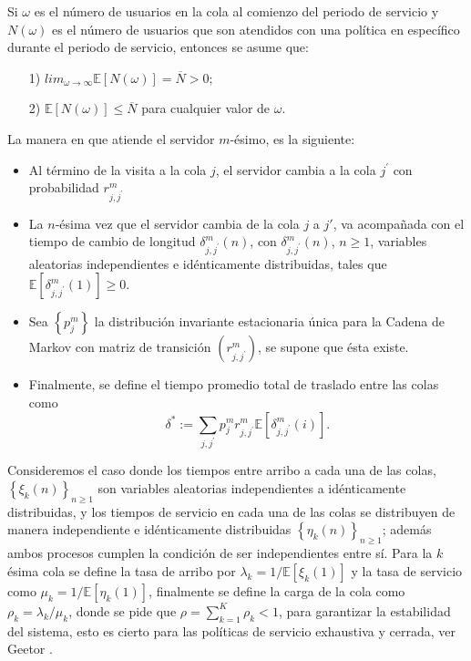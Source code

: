 \documentclass{article}
\newcommand{\esp}{\mathbb{E}}
\begin{document}
Si $\omega$ es el n\'umero de usuarios en la cola al comienzo del periodo de servicio y $N\left(\omega\right)$ es el n\'umero de usuarios que son atendidos con una pol\'itica en espec\'ifico durante el periodo de servicio, entonces se asume que:
\begin{itemize}
\item[1)]\label{S1}$lim_{\omega\rightarrow\infty}\esp\left[N\left(\omega\right)\right]=\overline{N}>0$;
\item[2)]\label{S2}$\esp\left[N\left(\omega\right)\right]\leq\overline{N}$
para cualquier valor de $\omega$.
\end{itemize}
La manera en que atiende el servidor $m$-\'esimo, es la siguiente:
\begin{itemize}
\item Al t\'ermino de la visita a la cola $j$, el servidor cambia a la cola $j^{'}$ con probabilidad $r_{j,j^{'}}^{m}$
\item La $n$-\'esima vez que el servidor cambia de la cola $j$ a $j'$, va acompa\~nada con el tiempo de cambio de longitud
$\delta_{j,j^{'}}^{m}\left(n\right)$, con $\delta_{j,j^{'}}^{m}\left(n\right)$, $n\geq1$, variables aleatorias independientes e id\'enticamente distribuidas, tales que $\esp\left[\delta_{j,j^{'}}^{m}\left(1\right)\right]\geq0$.

\item Sea $\left\{p_{j}^{m}\right\}$ la distribuci\'on invariante estacionaria \'unica para la Cadena de Markov con matriz de transici\'on $\left(r_{j,j^{'}}^{m}\right)$, se supone que \'esta existe.

\item Finalmente, se define el tiempo promedio total de traslado entre las colas como
\begin{equation}
\delta^{*}:=\sum_{j,j^{'}}p_{j}^{m}r_{j,j^{'}}^{m}\esp\left[\delta_{j,j^{'}}^{m}\left(i\right)\right].
\end{equation}
\end{itemize}

Consideremos el caso donde los tiempos entre arribo a cada una de las colas, $\left\{\xi_{k}\left(n\right)\right\}_{n\geq1}$ son variables aleatorias independientes a id\'enticamente distribuidas, y los tiempos de servicio en cada una de las colas se distribuyen de manera independiente e id\'enticamente distribuidas $\left\{\eta_{k}\left(n\right)\right\}_{n\geq1}$; adem\'as ambos procesos cumplen la condici\'on de ser independientes entre s\'i. Para la $k$ \'esima cola se define la tasa de arribo por $\lambda_{k}=1/\esp\left[\xi_{k}\left(1\right)\right]$ y la tasa de servicio como $\mu_{k}=1/\esp\left[\eta_{k}\left(1\right)\right]$, finalmente se define la carga de la cola como $\rho_{k}=\lambda_{k}/\mu_{k}$, donde se pide que $\rho=\sum_{k=1}^{K}\rho_{k}<1$, para garantizar la estabilidad del sistema, esto es cierto para las pol\'iticas de servicio exhaustiva y cerrada, ver Geetor \cite{Getoor}.\\
\end{document}
